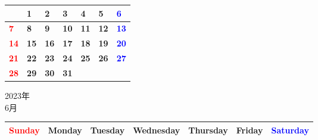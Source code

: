 \documentclass[a4paper,landscape]{jsarticle}
\newcommand{\dig}{\hspace{29mm}}
\newcommand{\tdig}{\hspace{27mm}}
\newcommand{\LBF}{\LARGE\textbf}
\begin{document}
\begingroup
\renewcommand{\arraystretch}{4}
\begin{tabular}{|p{32mm}|p{32mm}|p{32mm}|p{32mm}|p{32mm}|p{32mm}|p{32mm}|}
\hline
&\raisebox{30pt} {\dig\LBF{1}}&\raisebox{30pt} {\dig\LBF{2}}&\raisebox{30pt} {\dig\LBF{3}}&\raisebox{30pt} {\dig\LBF{4}}&\raisebox{30pt} {\dig\LBF{5}}&\raisebox{30pt} {\dig\textcolor{blue}{\LBF{6}}}\\
\hline
\raisebox{30pt} {\dig\textcolor{red}{\LBF{7}}}&\raisebox{30pt} {\dig\LBF{8}}&\raisebox{30pt} {\dig\LBF{9}}&\raisebox{30pt} {\tdig\LBF{10}}&\raisebox{30pt} {\tdig\LBF{11}}&\raisebox{30pt} {\tdig\LBF{12}}&\raisebox{30pt} {\tdig\textcolor{blue}{\LBF{13}}}\\
\hline
\raisebox{30pt} {\tdig\textcolor{red}{\LBF{14}}}&\raisebox{30pt} {\tdig\LBF{15}}&\raisebox{30pt} {\tdig\LBF{16}}&\raisebox{30pt} {\tdig\LBF{17}}&\raisebox{30pt} {\tdig\LBF{18}}&\raisebox{30pt} {\tdig\LBF{19}}&\raisebox{30pt} {\tdig\textcolor{blue}{\LBF{20}}}\\
\hline
\raisebox{30pt} {\tdig\textcolor{red}{\LBF{21}}}&\raisebox{30pt} {\tdig\LBF{22}}&\raisebox{30pt} {\tdig\LBF{23}}&\raisebox{30pt} {\tdig\LBF{24}}&\raisebox{30pt} {\tdig\LBF{25}}&\raisebox{30pt} {\tdig\LBF{26}}&\raisebox{30pt} {\tdig\textcolor{blue}{\LBF{27}}}\\
\hline
\raisebox{30pt} {\tdig\textcolor{red}{\LBF{28}}}&\raisebox{30pt} {\tdig\LBF{29}}&\raisebox{30pt} {\tdig\LBF{30}}&\raisebox{30pt} {\tdig\LBF{31}}&&&\\
\hline
\end{tabular}
\endgroup

\newpage

\begin{center}
	\LARGE 2023年\\
	\LARGE 6月
\end{center}

\begingroup
\renewcommand{\arraystretch}{1.4}
\begin{tabular}{|>{\centering\arraybackslash}p{32mm}|>{\centering\arraybackslash}p{32mm}|>{\centering\arraybackslash}p{32mm}|>{\centering\arraybackslash}p{32mm}|>{\centering\arraybackslash}p{32mm}|>{\centering\arraybackslash}p{32mm}|>{\centering\arraybackslash}p{32mm}|}
\hline
\textcolor{red}{\large Sunday}&\large Monday&\large Tuesday&\large Wednesday&\large Thursday&\large Friday&\textcolor{blue}{\large Saturday}\\
\hline
\end{tabular}
\endgroup
\end{document}
